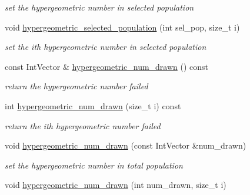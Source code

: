 \begin{DoxyCompactItemize}
\begin{DoxyCompactList}\small\item\em set the hypergeometric number in selected population \end{DoxyCompactList}\item 
void \hyperlink{classPecos_1_1AleatoryDistParams_a1a2cfb99642e88f0c3209777964bc2f8}{hypergeometric\+\_\+selected\+\_\+population} (int sel\+\_\+pop, size\+\_\+t i)\label{classPecos_1_1AleatoryDistParams_a1a2cfb99642e88f0c3209777964bc2f8}

\begin{DoxyCompactList}\small\item\em set the ith hypergeometric number in selected population \end{DoxyCompactList}\item 
const Int\+Vector \& \hyperlink{classPecos_1_1AleatoryDistParams_a8583a31034642737dee604b64f964537}{hypergeometric\+\_\+num\+\_\+drawn} () const \label{classPecos_1_1AleatoryDistParams_a8583a31034642737dee604b64f964537}

\begin{DoxyCompactList}\small\item\em return the hypergeometric number failed \end{DoxyCompactList}\item 
int \hyperlink{classPecos_1_1AleatoryDistParams_ab0baf470bc643233f22866d7726f1dd1}{hypergeometric\+\_\+num\+\_\+drawn} (size\+\_\+t i) const \label{classPecos_1_1AleatoryDistParams_ab0baf470bc643233f22866d7726f1dd1}

\begin{DoxyCompactList}\small\item\em return the ith hypergeometric number failed \end{DoxyCompactList}\item 
void \hyperlink{classPecos_1_1AleatoryDistParams_ac57c9c6f7452ff86eb3c256077ef7a5e}{hypergeometric\+\_\+num\+\_\+drawn} (const Int\+Vector \&num\+\_\+drawn)\label{classPecos_1_1AleatoryDistParams_ac57c9c6f7452ff86eb3c256077ef7a5e}

\begin{DoxyCompactList}\small\item\em set the hypergeometric number in total population \end{DoxyCompactList}\item 
void \hyperlink{classPecos_1_1AleatoryDistParams_ab02cdcc91e9ff0d83ee76b44883b7489}{hypergeometric\+\_\+num\+\_\+drawn} (int num\+\_\+drawn, size\+\_\+t i)\label{classPecos_1_1AleatoryDistParams_ab02cdcc91e9ff0d83ee76b44883b7489}


\end{DoxyCompactItemize}
